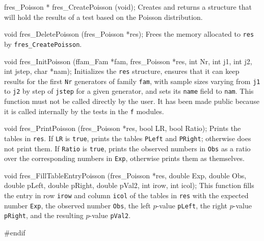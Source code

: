fres_Poisson * fres_CreatePoisson (void);
\endcode
 \tab
  Creates and returns a structure that will hold the results
  of a test based on the Poisson distribution.
 \endtab
\code


void fres_DeletePoisson (fres_Poisson *res);
\endcode
 \tab
  Frees the memory allocated to {\tt res} by {\tt fres\_CreatePoisson}.
 \endtab
\code
\hide

void fres_InitPoisson (ffam_Fam *fam, fres_Poisson *res,
                       int Nr, int j1, int j2, int jstep, char *nam);
\endcode
 \tab
   Initializes the {\tt res} structure, ensures that it can keep results
   for the first {\tt Nr} generators of family {\tt fam}, with sample sizes
   varying from {\tt j1} to {\tt j2} by step of {\tt jstep} for a given
   generator, and sets its {\tt name} field to {\tt nam}. This function
   must not be called directly by the user. It has been made public because
   it is called internally by the tests in the {\tt f} modules.
 \endtab
\code
\endhide

void fres_PrintPoisson (fres_Poisson *res, bool LR, bool Ratio);
\endcode
 \tab Prints the tables in {\tt res}. If {\tt LR} is {\tt true}, prints the
   tables {\tt PLeft} and {\tt PRight}; otherwise does not print them.
   If {\tt Ratio} is {\tt true}, prints the observed numbers in {\tt Obs} as
   a ratio over the corresponding numbers in  {\tt Exp}, otherwise prints
   them as themselves.
 \endtab
\code


void fres_FillTableEntryPoisson (fres_Poisson *res, double Exp, double Obs,
                                 double pLeft, double pRight, double pVal2,
                                 int irow, int icol);
\endcode
 \tab This function fills the entry in row {\tt irow} and column {\tt icol}
  of the tables in {\tt res} with the expected number {\tt Exp},
  the observed number {\tt Obs}, the left $p$-value {\tt pLeft},
  the right $p$-value {\tt pRight}, and the resulting
  $p$-value {\tt pVal2}.
 \endtab

\code
\hide
#endif
\endhide
\endcode
